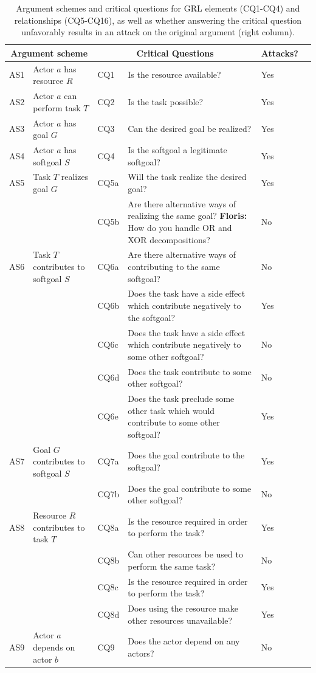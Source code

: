\documentclass[11.5pt,two column]{llncs}
\newcommand{\floris}[1]{{\color{red}\textbf{Floris: }#1}}
\begin{document}
\begin{table}[h]
\centering
\begin{tabular}{|l|l|l|l|l|l|}
\hline
\multicolumn{2}{|c|}{\textbf{Argument scheme}} & \multicolumn{2}{c|}{\textbf{Critical Questions}} & \textbf{Attacks?}\\
\hline
AS1 & Actor $a$ has resource $R$ & CQ1 &Is the resource available? & Yes\\
\hline
AS2 & Actor $a$ can perform task $T$ & CQ2 &Is the task possible? & Yes\\
\hline
AS3 & Actor $a$ has goal $G$ & CQ3 & Can the desired goal be realized? & Yes\\
\hline
AS4 & Actor $a$ has softgoal $S$ & CQ4 & Is the softgoal a legitimate softgoal? & Yes\\
\hline
\hline
AS5 & Task $T$ realizes goal $G$ & CQ5a & Will the task realize the desired goal? & Yes\\
& & CQ5b & Are there alternative ways of realizing the same goal? \floris{How do you handle OR and XOR decompositions?} & No\\
\hline
AS6 & Task $T$ contributes to softgoal $S$ & CQ6a & Are there alternative ways of contributing to the same softgoal? & No\\
&& CQ6b & Does the task have a side effect which contribute negatively to the softgoal?&Yes\\
&& CQ6c & Does the task have a side effect which contribute negatively to some other softgoal? & No\\
&& CQ6d & Does the task contribute to some other softgoal?&No\\
&& CQ6e & Does the task preclude some other task which would contribute to some other softgoal?&Yes\\
\hline
AS7 & Goal $G$ contributes to softgoal $S$ & CQ7a & Does the goal contribute to the softgoal? & Yes\\
&& CQ7b & Does the goal contribute to some other softgoal? & No\\
\hline
AS8 & Resource $R$ contributes to task $T$ & CQ8a & Is the resource required in order to perform the task? & Yes\\
&&CQ8b & Can other resources be used to perform the same task? & No\\
&&CQ8c & Is the resource required in order to perform the task? & Yes\\
&&CQ8d & Does using the resource make other resources unavailable? & Yes\\
\hline
AS9 & Actor $a$ depends on actor $b$ & CQ9 & Does the actor depend on any actors? & No\\
\hline
\end{tabular}
\caption{Argument schemes and critical questions for GRL elements (CQ1-CQ4) and relationships (CQ5-CQ16), as well as whether answering the critical question unfavorably results in an attack on the original argument (right column).}
\label{table:argument-schemes}
\end{table}
\end{document}
